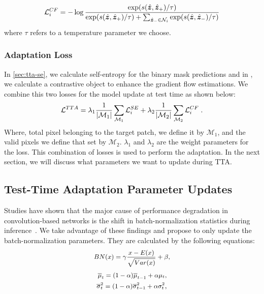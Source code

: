 \begin{equation}
    \small
    \mathcal{L}_i^{CF} = - \log \frac{\exp( s (\hat{\bm{ z}}, \hat{\bm{ z}}_+)/\tau )}{ \exp( s (\hat{\bm{ z}}, \hat{\bm{ z}}_+)/\tau ) + \sum_{\hat{\bm{ z}}_- \in \mathcal{N}_i} \exp( s (\hat{\bm{ z}}, \hat{\bm{ z}}_-)/\tau ) }\\
    \label{eq-contrastive-flow-loss}
  \end{equation}
where $\tau$ refers to a temperature parameter we choose. 

\subsubsection{Adaptation Loss}
In \cref{sec:tta-se}, we calculate self-entropy for the binary mask predictions and in , we calculate a contrastive object to enhance the gradient flow estimations. We combine this two losses for the model update at test time as shown below:
\begin{equation}
    \small
    \mathcal{L}^{TTA} = \lambda_1\frac{1}{| \mathcal{M}_1 |} \sum_{\mathcal{M}_{1}} \mathcal{L}^{SE}_i + \lambda_2\frac{1}{| \mathcal{M}_2 |} \sum_{\mathcal{M}_2} \mathcal{L}^{CF}_i \; .
    \label{eq-tta-loss}
  \end{equation}
Where, total pixel belonging to the target patch, we define it by $\mathcal{M}_1$, and the valid pixels we define that set by $\mathcal{M}_2$. $\lambda_1$ and $\lambda_2$ are the weight parameters for the loss. This combination of losses is used to perform the adaptation. In the next section, we will discuss what parameters we want to update during TTA. 

\subsection{Test-Time Adaptation Parameter Updates}
Studies have shown that the major cause of performance degradation in convolution-based networks is the shift in batch-normalization statistics during inference~\cite{wang2020tent,niu2022efficient,zaveri2025improving,li2016revisiting,mirza2022norm,pan2018two,schneider2020improving}. We take advantage of these findings and propose to only update the batch-normalization parameters. They are calculated by the following equations:
\begin{equation}\small
    \centering
    \label{eq:bn}
        \begin{aligned}  
        BN(x) = \gamma \frac{x - E(x)}{\sqrt{Var(x)}} +  \beta ,
        \end{aligned}
\end{equation}
\begin{equation}\small
    \centering
    \label{eq:bn_running}
        \begin{aligned}  
            \overline{\mu}_t = (1-\alpha)  \overline{\mu}_{t-1} +  \alpha  {\mu}_t ,\\
            \overline{\sigma}_{t}^2 = (1-\alpha) \overline{\sigma}_{t-1}^2 +  \alpha {\sigma}_{t}^2 ,
        \end{aligned}
\end{equation}

